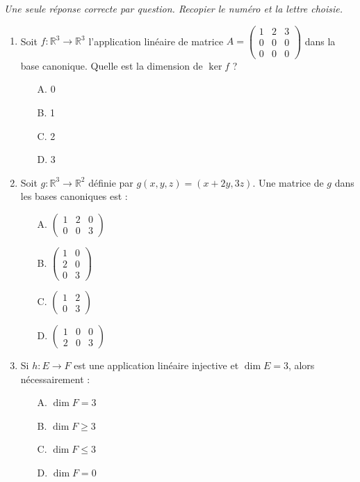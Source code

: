 \documentclass[11pt]{article}
\begin{document}
\begin{exercice}
\emph{Une seule réponse correcte par question. Recopier le numéro et la lettre choisie.}
\begin{enumerate}
    \item Soit $f : \mathbb{R}^3 \to \mathbb{R}^3$ l'application linéaire de matrice $A = \begin{pmatrix} 1 & 2 & 3 \\ 0 & 0 & 0 \\ 0 & 0 & 0 \end{pmatrix}$ dans la base canonique. Quelle est la dimension de $\ker f$ ?
    \begin{itemize}
        \item[A.] 0 \quad \item[B.] 1 \quad \item[C.] 2 \quad \item[D.] 3
    \end{itemize}
    \item Soit $g : \mathbb{R}^3 \to \mathbb{R}^2$ définie par $g(x,y,z) = (x+2y, 3z)$. Une matrice de $g$ dans les bases canoniques est :
    \begin{itemize}
        \item[A.] $\begin{pmatrix} 1 & 2 & 0 \\ 0 & 0 & 3 \end{pmatrix}$ \quad
        \item[B.] $\begin{pmatrix} 1 & 0 \\ 2 & 0 \\ 0 & 3 \end{pmatrix}$ \quad
        \item[C.] $\begin{pmatrix} 1 & 2 \\ 0 & 3 \end{pmatrix}$ \quad
        \item[D.] $\begin{pmatrix} 1 & 0 & 0 \\ 2 & 0 & 3 \end{pmatrix}$
    \end{itemize}
    \item Si $h : E \to F$ est une application linéaire injective et $\dim E = 3$, alors nécessairement :
    \begin{itemize}
        \item[A.] $\dim F = 3$ \quad \item[B.] $\dim F \ge 3$ \quad \item[C.] $\dim F \le 3$ \quad \item[D.] $\dim F = 0$
    \end{itemize}
\end{enumerate}
\end{exercice}
\end{document}
